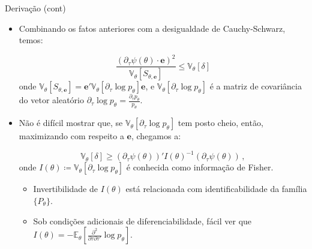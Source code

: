 \documentclass[11pt]{beamer}
\begin{document}
	\begin{frame}{Derivação (cont)}
		\begin{itemize}
			\item Combinando os fatos anteriores com a desigualdade de Cauchy-Schwarz, temos:
			
			$$\frac{(\partial_{\tau}\psi(\theta)\cdot \boldsymbol{e})^2}{ \mathbb{V}_\theta[S_{\theta,\boldsymbol{e}}]} \leq \mathbb{V}_{\theta}[\delta]$$
			onde $\mathbb{V}_\theta[S_{\theta,\boldsymbol{e}}]= \boldsymbol{e}'\mathbb{V}_\theta\left[\partial_\tau \log p_\theta\right]\boldsymbol{e}$, e $\mathbb{V}_\theta\left[\partial_\tau \log p_\theta\right]$ é a matriz de covariância do vetor aleatório $\partial_\tau \log p_\theta = \frac{\partial_\tau p_\theta}{p_\theta}$.
			\item Não é difícil mostrar que, se $\mathbb{V}_\theta\left[\partial_\tau \log p_\theta\right]$ tem posto cheio, então, maximizando com respeito a $\boldsymbol{e}$, chegamos a:
			
				$$ \mathbb{V}_{\theta}[\delta]\geq (\partial_{\tau}\psi(\theta))' I(\theta)^{-1} (\partial_{\tau}\psi(\theta))\, ,$$
				onde $I(\theta) \coloneqq \mathbb{V}_\theta\left[\partial_\tau \log p_\theta\right]$ é conhecida como informação de Fisher.
				\begin{itemize}
					\item Invertibilidade de $I(\theta)$ está relacionada com identificabilidade da família $\{P_\theta\}$.
					\item Sob condições adicionais de diferenciabilidade, fácil ver que $I(\theta) = -\mathbb{E}_\theta[\frac{\partial^2}{\partial \tau\partial\tau'} \log p_\theta]$.
				\end{itemize}
		\end{itemize}
	\end{frame}
	

	
\end{document}
